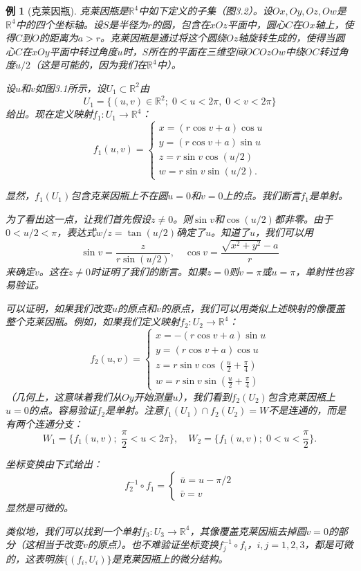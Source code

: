 \documentclass[12pt,a4paper]{ctexbook}
\newtheorem{example}[theorem]{例}
\begin{document}
\begin{example}[克莱因瓶]
克莱因瓶是$\mathbb{R}^4$中如下定义的子集（图3.2）。设$Ox,Oy,Oz,Ow$是$\mathbb{R}^4$中的四个坐标轴。设$S$是半径为$r$的圆，包含在$xOz$平面中，圆心$C$在$Ox$轴上，使得$C$到$O$的距离为$a>r$。克莱因瓶是通过将这个圆绕$Oz$轴旋转生成的，使得当圆心$C$在$xOy$平面中转过角度$u$时，$S$所在的平面在三维空间$OCOzOw$中绕$OC$转过角度$u/2$（这是可能的，因为我们在$\mathbb{R}^4$中）。

设$u$和$v$如图3.1所示，设$U_1\subset\mathbb{R}^2$由
$$U_1 = \{(u,v)\in\mathbb{R}^2;\; 0<u<2\pi,\; 0<v<2\pi\}$$
给出。现在定义映射$f_1:U_1\to\mathbb{R}^4$：
$$f_1(u,v) = \begin{cases}
x = (r\cos v + a)\cos u \\
y = (r\cos v + a)\sin u \\
z = r\sin v\cos(u/2) \\
w = r\sin v\sin(u/2).
\end{cases}$$

显然，$f_1(U_1)$包含克莱因瓶上不在圆$u=0$和$v=0$上的点。我们断言$f_1$是单射。

为了看出这一点，让我们首先假设$z\neq 0$。则$\sin v$和$\cos(u/2)$都非零。由于$0<u/2<\pi$，表达式$w/z = \tan(u/2)$确定了$u$。知道了$u$，我们可以用
$$\sin v = \frac{z}{r\sin(u/2)},\quad \cos v = \frac{\sqrt{x^2+y^2} - a}{r}$$
来确定$v$。这在$z\neq 0$时证明了我们的断言。如果$z=0$则$v=\pi$或$u=\pi$，单射性也容易验证。

可以证明，如果我们改变$u$的原点和$v$的原点，我们可以用类似上述映射的像覆盖整个克莱因瓶。例如，如果我们定义映射$f_2:U_2\to\mathbb{R}^4$：
$$f_2(u,v) = \begin{cases}
x = -(r\cos v + a)\sin u \\
y = (r\cos v + a)\cos u \\
z = r\sin v\cos\left(\frac{u}{2} + \frac{\pi}{4}\right) \\
w = r\sin v\sin\left(\frac{u}{2} + \frac{\pi}{4}\right)
\end{cases}$$
（几何上，这意味着我们从$Oy$开始测量$u$），我们看到$f_2(U_2)$包含克莱因瓶上$u=0$的点。容易验证$f_2$是单射。注意$f_1(U_1)\cap f_2(U_2)=W$不是连通的，而是有两个连通分支：
$$W_1 = \{f_1(u,v);\; \frac{\pi}{2} < u < 2\pi\},\quad W_2 = \{f_1(u,v);\; 0 < u < \frac{\pi}{2}\}.$$

坐标变换由下式给出：
$$f_2^{-1}\circ f_1 = \begin{cases}
\bar{u} = u - \pi/2 \\
\bar{v} = v
\end{cases}$$
显然是可微的。

类似地，我们可以找到一个单射$f_3:U_3\to\mathbb{R}^4$，其像覆盖克莱因瓶去掉圆$v=0$的部分（这相当于改变$v$的原点）。也不难验证坐标变换$f_j^{-1}\circ f_i$，$i,j=1,2,3$，都是可微的，这表明族$\{(f_i,U_i)\}$是克莱因瓶上的微分结构。
\end{example}
\end{document}
